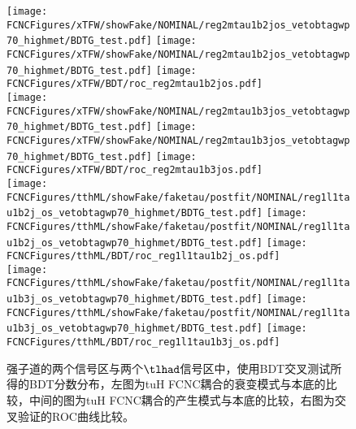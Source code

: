 \begin{figure}[H]
\centering
\texttt{[image: \\FCNCFigures/xTFW/showFake/NOMINAL/reg2mtau1b2jos\_vetobtagwp70\_highmet/BDTG\_test.pdf]}
\texttt{[image: \\FCNCFigures/xTFW/showFake/NOMINAL/reg2mtau1b2jos\_vetobtagwp70\_highmet/BDTG\_test.pdf]}
\texttt{[image: \\FCNCFigures/xTFW/BDT/roc\_reg2mtau1b2jos.pdf]}\\
\texttt{[image: \\FCNCFigures/xTFW/showFake/NOMINAL/reg2mtau1b3jos\_vetobtagwp70\_highmet/BDTG\_test.pdf]}
\texttt{[image: \\FCNCFigures/xTFW/showFake/NOMINAL/reg2mtau1b3jos\_vetobtagwp70\_highmet/BDTG\_test.pdf]}
\texttt{[image: \\FCNCFigures/xTFW/BDT/roc\_reg2mtau1b3jos.pdf]}\\
\texttt{[image: \\FCNCFigures/tthML/showFake/faketau/postfit/NOMINAL/reg1l1tau1b2j\_os\_vetobtagwp70\_highmet/BDTG\_test.pdf]}
\texttt{[image: \\FCNCFigures/tthML/showFake/faketau/postfit/NOMINAL/reg1l1tau1b2j\_os\_vetobtagwp70\_highmet/BDTG\_test.pdf]}
\texttt{[image: \\FCNCFigures/tthML/BDT/roc\_reg1l1tau1b2j\_os.pdf]}\\
\texttt{[image: \\FCNCFigures/tthML/showFake/faketau/postfit/NOMINAL/reg1l1tau1b3j\_os\_vetobtagwp70\_highmet/BDTG\_test.pdf]}
\texttt{[image: \\FCNCFigures/tthML/showFake/faketau/postfit/NOMINAL/reg1l1tau1b3j\_os\_vetobtagwp70\_highmet/BDTG\_test.pdf]}
\texttt{[image: \\FCNCFigures/tthML/BDT/roc\_reg1l1tau1b3j\_os.pdf]}\\
\caption{强子道的两个信号区与两个$\tlhad$信号区中，使用BDT交叉测试所得的BDT分数分布，左图为tuH FCNC耦合的衰变模式与本底的比较，中间的图为tuH FCNC耦合的产生模式与本底的比较，右图为交叉验证的ROC曲线比较。}
\label{fig:overtrain_lephad}
\end{figure}
